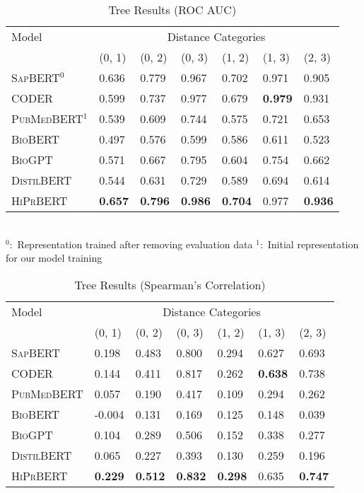 \documentclass[12pt,a4paper]{cibb}
\begin{document}
\begin{table}[h]
\centering
\caption{Tree Results (ROC AUC)}
\label{table:auc1}
\begin{tabular}{lllllll}
Model & \multicolumn{6}{c}{Distance Categories}\\
\cline{2-7}
& (0, 1) & (0, 2) & (0, 3) & (1, 2) & (1, 3) & (2, 3)\\
\hline
\textsc{SapBERT}$^0$ & 0.636 & 0.779 & 0.967 & 0.702 & 0.971 & 0.905 \\
\textsc{CODER} & 0.599 & 0.737 & 0.977 & 0.679 & \textbf{0.979} & 0.931 \\
\textsc{PubMedBERT}$^1$ & 0.539 & 0.609 & 0.744 & 0.575 & 0.721 & 0.653 \\
\textsc{BioBERT} & 0.497 & 0.576 & 0.599 & 0.586 & 0.611 & 0.523 \\
\textsc{BioGPT} & 0.571 & 0.667 & 0.795 & 0.604 & 0.754 & 0.662 \\
\textsc{DistilBERT} & 0.544 & 0.631 & 0.729 & 0.589 & 0.694 & 0.614  \\
\hline
\textsc{HiPrBERT} & \textbf{0.657} & \textbf{0.796} & \textbf{0.986} & \textbf{0.704} & 0.977 & \textbf{0.936} \\
\end{tabular}
\\
\footnotesize{$^0:$ Representation trained after removing evaluation data $^1:$ Initial representation for our model training}
\end{table}

\begin{table}[ht]
\centering
\caption{Tree Results (Spearman's Correlation)}
\label{table:spear1}
\begin{tabular}{lllllll}
Model & \multicolumn{6}{c}{Distance Categories}\\
\cline{2-7}
& (0, 1) & (0, 2) & (0, 3) & (1, 2) & (1, 3) & (2, 3)\\
\hline
\textsc{SapBERT} & 0.198 & 0.483 & 0.800 & 0.294 & 0.627 & 0.693 \\
\textsc{CODER} & 0.144 & 0.411 & 0.817 & 0.262 & \textbf{0.638} & 0.738 \\
\textsc{PubMedBERT} & 0.057 & 0.190 & 0.417 & 0.109 & 0.294 & 0.262 \\
\textsc{BioBERT} & -0.004 & 0.131 & 0.169 & 0.125 & 0.148 & 0.039 \\
\textsc{BioGPT} & 0.104 & 0.289 & 0.506 & 0.152 & 0.338 & 0.277 \\
\textsc{DistilBERT} & 0.065 & 0.227 & 0.393 & 0.130 & 0.259 & 0.196  \\
\hline
\textsc{HiPrBERT} & \textbf{0.229} & \textbf{0.512} & \textbf{0.832} & \textbf{0.298} & 0.635 & \textbf{0.747} \\
\end{tabular}
\end{table}
\end{document}
